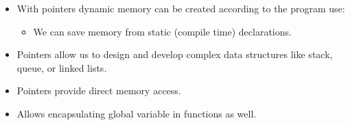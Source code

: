 \begin{itemize}
    \item With pointers dynamic memory can be created according to the program use:
        \begin{itemize}
            \item We can save memory from static (compile time) declarations.
        \end{itemize}
    
    \item Pointers allow us to design and develop complex data structures like stack, queue, or linked lists.
    \item Pointers provide direct memory access.
    \item Allows encapsulating global variable in functions as well.
\end{itemize}



